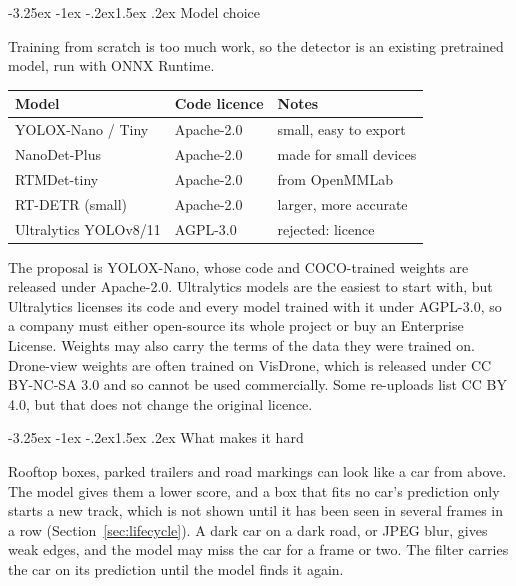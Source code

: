 \documentclass[11pt]{article}
\makeatletter
\renewcommand\subsection{\@startsection{subsection}{2}{\z@}%
  {-3.25ex \@plus -1ex \@minus -.2ex}{1.5ex \@plus .2ex}%
  {\normalfont\large\bfseries\color{accent}}}
\makeatother
\begin{document}
\subsection{Model choice}

Training from scratch is too much work, so the detector is an existing
pretrained model, run with ONNX Runtime.

\begin{center}
\begin{tabular}{|l|l|l|}
  \hline
  \rowcolor{headcolor}
  Model & Code licence & Notes \\
  \hline
  YOLOX-Nano / Tiny & Apache-2.0 & small, easy to export \\
  NanoDet-Plus & Apache-2.0 & made for small devices \\
  RTMDet-tiny & Apache-2.0 & from OpenMMLab \\
  RT-DETR (small) & Apache-2.0 & larger, more accurate \\
  Ultralytics YOLOv8/11 & AGPL-3.0 & rejected: licence \\
  \hline
\end{tabular}
\end{center}

The proposal is YOLOX-Nano, whose code and COCO-trained weights are released
under Apache-2.0. Ultralytics models are the easiest to start with, but
Ultralytics licenses its code and every model trained with it under
AGPL-3.0, so a company must either open-source its whole project or buy an
Enterprise License. Weights may also carry the terms of the data they were
trained on. Drone-view weights are often trained on VisDrone, which is
released under CC BY-NC-SA 3.0 and so cannot be used commercially. Some
re-uploads list CC BY 4.0, but that does not change the original licence.

\subsection{What makes it hard}

Rooftop boxes, parked trailers and road markings can look like a car from
above. The model gives them a lower score, and a box that fits no car's
prediction only starts a new track, which is not shown until it has been
seen in several frames in a row (Section~\ref{sec:lifecycle}). A dark car on
a dark road, or JPEG blur, gives weak edges, and the model may miss the car
for a frame or two. The filter carries the car on its prediction until the
model finds it again.
\end{document}
